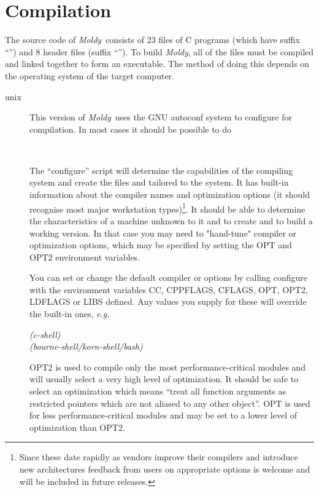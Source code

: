 \documentclass[a4paper,twoside]{report}
\newcommand{\moldy}{\emph{Moldy}}
\newcommand{\eg}{\emph{e.g.}}
\begin{document}
\section{Compilation}%
\label{sec:compile}
The source code of \moldy\  consists of 23 files of C programs (which have
suffix ``'') and 8 header files (suffix ``'').
To build \moldy, all of the  files must be compiled and linked
together to form an executable.  The method of doing this depends on
the operating system of the target computer.
\begin{description}
\item[unix]  
This version of \moldy\ uses the GNU autoconf system to configure for
compilation.  In most cases it should be possible to do

\\

The ``configure'' script will determine the capabilities of the
compiling system and create the files  and
 tailored to the system.  It has built-in information
about the compiler names and optimization options (it should recognise
most major workstation types)\footnote{Since these date rapidly as
  vendors improve their compilers and introduce new architectures
  feedback from users on appropriate options is welcome and will be
  included in future releases.}.  It should be able to determine the
characteristics of a machine unknown to it and to create  and
 to build a working version.  In that case you may need to
"hand-tune" compiler or optimization options, which may be specified
by setting the OPT and OPT2 environment variables.

You can set or change the default compiler or options by calling
configure with the environment variables CC, CPPFLAGS, CFLAGS, OPT,
OPT2, LDFLAGS or LIBS defined.  Any values you supply for these will
override the built-in ones, \eg\


\begin{tabbing}
 \=    \emph{(c-shell)}\\
      \>   \emph{(bourne-shell/korn-shell/bash)}
\end{tabbing}

OPT2 is used to compile only the most performance-critical modules and
will usually select a very high level of optimization.  It should be
safe to select an optimization which means ``treat all function
arguments as restricted pointers which are not aliased to any other
object''.  OPT is used for less performance-critical modules and may be
set to a lower level of optimization than OPT2.


\end{description}
\end{document}
